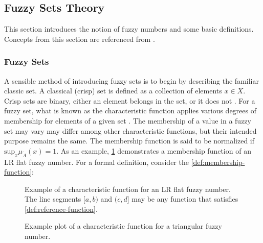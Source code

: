\documentclass[ee,msthesis]{usuthesis}
\begin{document}
\subsection{Fuzzy Sets Theory}
\label{sec:fuzzy-sets-theory}
This section introduces the notion of fuzzy numbers and some basic definitions. Concepts from this section are
referenced from
\cite{zimmermann-2001-fuzzy-set,das-2016-mathem-model,yaghobi-2014-compar-fuzzy,bello-2019-fuzzy-activ}.

\subsubsection{Fuzzy Sets}
\label{sec:org80e99ae}
A sensible method of introducing fuzzy sets is to begin by describing the familiar classic set. A classical (crisp) set
is defined as a collection of elements \(x \in X\). Crisp sets are binary, either an element belongs in the set, or it does
not \cite{zimmermann-2001-fuzzy-set}. For a fuzzy set, what is known as the characteristic function applies various
degrees of membership for elements of a given set \cite{zimmermann-2001-fuzzy-set}. The membership of a value in a
fuzzy set may vary may differ among other characteristic functions, but their intended purpose remains the same. The
membership function is said to be normalized if \(\text{sup}_x \mu_{\tilde{A}}(x) = 1\). As an example,
\ref{fig:lr-fuzzy-characteristic} demonstrates a membership function of an LR flat fuzzy number. For a formal definition, consider
the \ref{def:membership-function}:

\begin{subfigures}
    \begin{figure}[htpb]
    \centering
        
        \caption{Example of a characteristic function for an LR flat fuzzy number. The line segments $[a,b)$ and $(c,d]$
          may be any function that satisfies \ref{def:reference-function}.}
        \label{fig:lr-fuzzy-characteristic}
    \end{figure}
    \hfill

    \begin{figure}[htpb]
    \centering
        
        \caption{Example plot of a characteristic function for a triangular fuzzy number.}
        \label{fig:triang-characteristic}
    \end{figure}
\end{subfigures}
\end{document}
